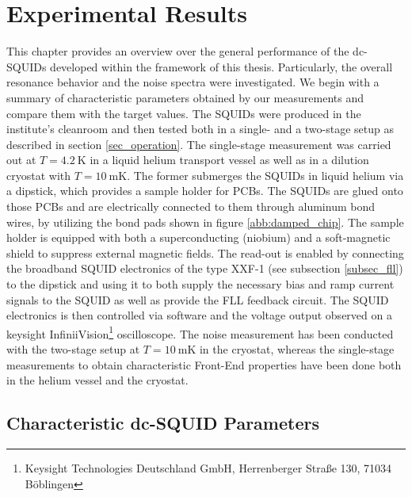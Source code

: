 \chapter{Experimental Results} \label{ch_results}

This chapter provides an overview over the general performance of the dc-SQUIDs developed within the framework of this thesis. Particularly, the overall resonance behavior and the noise spectra were investigated. We begin with a summary of characteristic parameters obtained by our measurements and compare them with the target values. The SQUIDs were produced in the institute's cleanroom and then tested both in a single- and a two-stage setup as described in section \ref{sec_operation}. The single-stage measurement was carried out at $T=\qty{4.2}{\kelvin}$ in a liquid helium transport vessel as well as in a dilution cryostat with $T=\qty{10}{\milli\kelvin}$. The former submerges the SQUIDs in liquid helium via a dipstick, which provides a sample holder for PCBs. The SQUIDs are glued onto those PCBs and are electrically connected to them through aluminum bond wires, by utilizing the bond pads shown in figure \ref{abb:damped_chip}. The sample holder is equipped with both a superconducting (niobium) and a soft-magnetic shield to suppress external magnetic fields. The read-out is enabled by connecting the broadband SQUID electronics of the type XXF-1 (see subsection \ref{subsec_fll}) to the dipstick and using it to both supply the necessary bias and ramp current signals to the SQUID as well as provide the FLL feedback circuit. The SQUID electronics is then controlled via software and the voltage output observed on a keysight InfiniiVision\footnote{Keysight Technologies Deutschland GmbH, Herrenberger Straße 130, 71034 Böblingen} oscilloscope. The noise measurement has been conducted with the two-stage setup at $T=\qty{10}{\milli\kelvin}$ in the cryostat, whereas the single-stage measurements to obtain characteristic Front-End properties have been done both in the helium vessel and the cryostat. 

\section{Characteristic dc-SQUID Parameters} \label{sec_charac}

